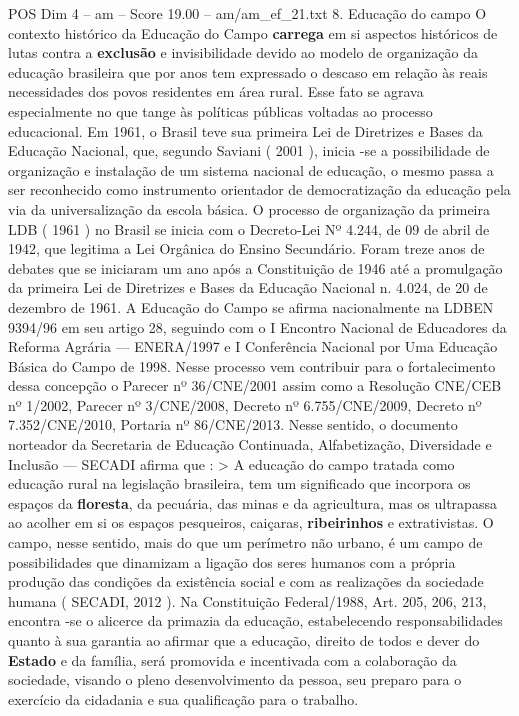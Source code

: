 \begin{textsample}{POS Dim 4 – am – Score 19.00 – am/am\_ef\_21.txt}  \label{ex:f4_pos_102}
8.
Educação do campo O contexto histórico da Educação do Campo \textbf{carrega} em si aspectos históricos de lutas contra a \textbf{exclusão} e invisibilidade devido ao modelo de organização da educação brasileira que por anos tem expressado o descaso em relação às reais necessidades dos povos residentes em área rural.
Esse fato se agrava especialmente no que tange às políticas públicas voltadas ao processo educacional.
Em 1961, o Brasil teve sua primeira Lei de Diretrizes e Bases da Educação Nacional, que, segundo Saviani ( 2001 ), inicia -se a possibilidade de organização e instalação de um sistema nacional de educação, o mesmo passa a ser reconhecido como instrumento orientador de democratização da educação pela via da universalização da escola básica.
O processo de organização da primeira LDB ( 1961 ) no Brasil se inicia com o Decreto-Lei Nº 4.244, de 09 de abril de 1942, que legitima a Lei Orgânica do Ensino Secundário.
Foram treze anos de debates que se iniciaram um ano após a Constituição de 1946 até a promulgação da primeira Lei de Diretrizes e Bases da Educação Nacional n. 4.024, de 20 de dezembro de 1961.
A Educação do Campo se afirma nacionalmente na LDBEN 9394/96 em seu artigo 28, seguindo com o I Encontro Nacional de Educadores da Reforma Agrária — ENERA/1997 e I Conferência Nacional por Uma Educação Básica do Campo de 1998.
Nesse processo vem contribuir para o fortalecimento dessa concepção o Parecer nº 36/CNE/2001 assim como a Resolução CNE/CEB nº 1/2002, Parecer nº 3/CNE/2008, Decreto nº 6.755/CNE/2009, Decreto nº 7.352/CNE/2010, Portaria nº 86/CNE/2013.
Nesse sentido, o documento norteador da Secretaria de Educação Continuada, Alfabetização, Diversidade e Inclusão — SECADI afirma que : > A educação do campo tratada como educação rural na legislação brasileira, tem um significado que incorpora os espaços da \textbf{floresta}, da pecuária, das minas e da agricultura, mas os ultrapassa ao acolher em si os espaços pesqueiros, caiçaras, \textbf{ribeirinhos} e extrativistas.
O campo, nesse sentido, mais do que um perímetro não urbano, é um campo de possibilidades que dinamizam a ligação dos seres humanos com a própria produção das condições da existência social e com as realizações da sociedade humana ( SECADI, 2012 ).
Na Constituição Federal/1988, Art. 205, 206, 213, encontra -se o alicerce da primazia da educação, estabelecendo responsabilidades quanto à sua garantia ao afirmar que a educação, direito de todos e dever do \textbf{Estado} e da família, será promovida e incentivada com a colaboração da sociedade, visando o pleno desenvolvimento da pessoa, seu preparo para o exercício da cidadania e sua qualificação para o trabalho.

\end{textsample}
